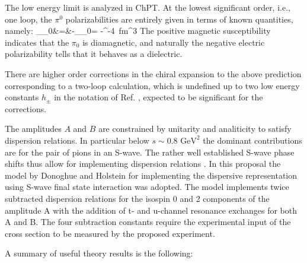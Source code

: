 The low energy limit is analyzed in ChPT. At the lowest significant
order, i.e., one loop, the $\pi^0$ polarizabilities are entirely given
in terms of known quantities, namely:
\bea
\alpha_{\pi_0}&=&-\beta_{\pi_0}= -^{-4}~{\rm fm}^3
\eea
The positive magnetic susceptibility indicates that the $\pi_0$ is
diamagnetic, and naturally the negative electric polarizability tells
that it behaves as a dielectric.

There are higher order corrections in the chiral expansion to the
above prediction corresponding to a two-loop calculation, which is
undefined up to two low energy constants $h_\pm$ in the notation of
Ref. \cite{Bellucci:1994eb}, expected to be significant for the
corrections.

The amplitudes $A$ and $B$ are constrained by unitarity and
analiticity to satisfy dispersion relations. In particular below
$s\sim 0.8\text{ GeV}^2$ the dominant contributions are for the pair
of pions in an S-wave. The rather well established S-wave phase shifts
thus allow for implementing dispersion
relations \cite{Donoghue:1993kw,
Oller:2008kf,Moussallam:2013una,Dai:2014zta,Dai:2014lza,Dai:2016ytz}.
In this proposal the model by Donoghue and
Holstein \cite{Donoghue:1993kw} for implementing the dispersive
representation using S-wave final state interaction was adopted. The
model implements twice subtracted dispersion relations for the isospin
0 and 2 components of the amplitude A with the addition of t- and
u-channel resonance exchanges for both A and B. The four subtraction
constants require the experimental input of the cross section to be
measured by the proposed experiment.

A summary of useful  theory results is the following:  

